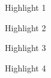 \begin{highlights}
       \item Highlight 1 
       \item Highlight 2
       \item Highlight 3
       \item Highlight 4
\end{highlights}
